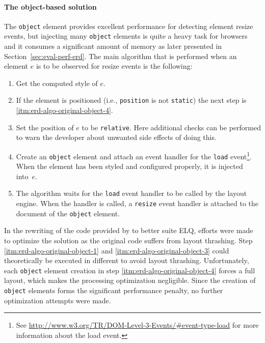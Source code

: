 \documentclass[a4paper,11pt]{kth-mag}
\newcommand{\code}[1]{\texttt{#1}}
\begin{document}
        \paragraph{The object-based solution}
        The \code{object} \gls{element} provides excellent performance for detecting \gls{element} resize events, but injecting many \code{object} \glspl{element} is quite a heavy task for \glspl{browser} and it consumes a significant amount of memory as later presented in Section~\ref{sec:eval-perf-erd}.
        The main algorithm that is performed when an element $e$ is to be observed for resize events is the following:
        \begin{enumerate}
          \item\label{itm:erd-algo-original-object-1} Get the computed style of $e$.
          \item                                       If the element is positioned (i.e., \code{position} is not \code{static}) the next step is \ref{itm:erd-algo-original-object-4}.
          \item\label{itm:erd-algo-original-object-3} Set the position of $e$ to be \code{relative}. Here additional checks can be performed to warn the developer about unwanted side effects of doing this.
          \item\label{itm:erd-algo-original-object-4} Create an \code{object} element and attach an event handler for the \code{load} event\footnote{See \url{http://www.w3.org/TR/DOM-Level-3-Events/\#event-type-load} for more information about the load event.}. When the element has been styled and configured properly, it is injected into~$e$.
          \item                                       The algorithm waits for the \code{load} event handler to be called by the \gls{layout engine}. When the handler is called, a \code{resize} event handler is attached to the \gls{document} of the \code{object} \gls{element}.
        \end{enumerate}
        In the rewriting of the code provided by \cite{backalley} to better suite \gls{ELQ}, efforts were made to optimize the solution as the original code suffers from \gls{layout thrashing}.
        Step \ref{itm:erd-algo-original-object-1} and \ref{itm:erd-algo-original-object-3} could theoretically be executed in different  to avoid \gls{layout thrashing}.
        Unfortunately, each \code{object} element creation in step \ref{itm:erd-algo-original-object-4} forces a full layout, which makes the  processing optimization negligible.
        Since the creation of \code{object} \glspl{element} forms the significant performance penalty, no further optimization attempts were made.
\end{document}

